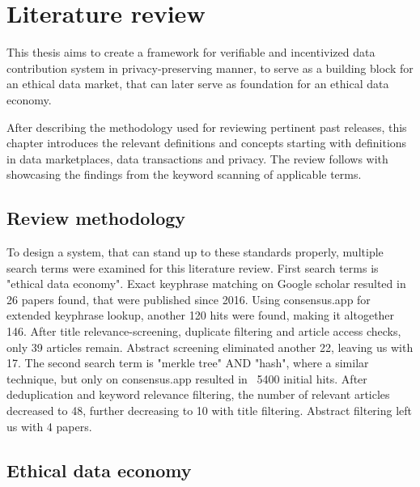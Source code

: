 \documentclass[english, 12pt, a4paper, sci, utf8, a-2b, online]{aaltothesis}
\theoremstyle{change}
\theoremstyle{theoremstyle}
\begin{document}
\section{Literature review}
This thesis aims to create a framework for verifiable and incentivized data contribution system in privacy-preserving manner, to serve as a building block for an ethical data market, that can later serve as foundation for an ethical data economy. 

After describing the methodology used for reviewing pertinent past releases, this chapter introduces the relevant definitions and concepts starting with definitions in data marketplaces, data transactions and privacy.
The review follows with showcasing the findings from the keyword scanning of applicable terms.

\subsection{Review methodology}
To design a system, that can stand up to these standards properly, multiple search terms were examined for this literature review. First search terms is "ethical data economy". Exact keyphrase matching on Google scholar \cite{scholargoogle_ethicaldataeconomy2026} resulted in 26 papers found, that were published since 2016.
Using consensus.app \cite{consensus_ethicaldataeconomy2026} for extended keyphrase lookup, another 120 hits were found, making it altogether 146. After title relevance-screening, duplicate filtering and article access checks, only 39 articles remain. Abstract screening eliminated another 22, leaving us with 17.
The second search term is "merkle tree" AND "hash", where a similar technique, but only on consensus.app \cite{consensus_merkleandhash2026} resulted in ~5400 initial hits. After deduplication and keyword relevance filtering, the number of relevant articles decreased to 48, further decreasing to 10 with title filtering. Abstract filtering left us with 4 papers.



\subsection{Ethical data economy}
\end{document}
